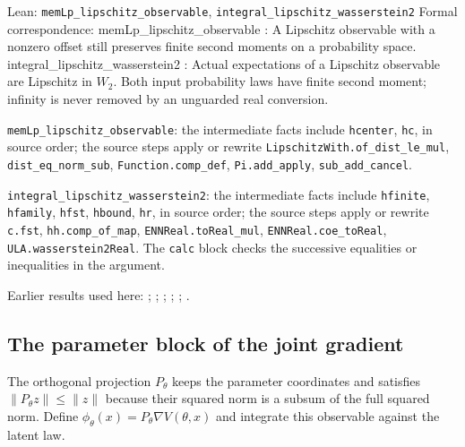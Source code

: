 \documentclass[11pt,a4paper]{report}
\begin{document}
\begin{leanbox}{Lean: \texttt{memLp\_\allowbreak{}lipschitz\_\allowbreak{}observable}, \texttt{integral\_\allowbreak{}lipschitz\_\allowbreak{}wasserstein2}}
Formal correspondence: memLp\_lipschitz\_observable : A Lipschitz observable with a nonzero offset still preserves finite second moments on a probability space. integral\_lipschitz\_wasserstein2 : Actual expectations of a Lipschitz observable are Lipschitz in \(W_2\). Both input probability laws have finite second moment; infinity is never removed by an unguarded real conversion.



\texttt{mem\allowbreak{}Lp\_\allowbreak{}lipschitz\_\allowbreak{}observable}: the intermediate facts include \texttt{hcenter}, \texttt{hc}, in source order; the source steps apply or rewrite \texttt{Lipschitz\allowbreak{}With.\allowbreak{}of\_\allowbreak{}dist\_\allowbreak{}le\_\allowbreak{}mul}, \texttt{dist\_\allowbreak{}eq\_\allowbreak{}norm\_\allowbreak{}sub}, \texttt{Function.\allowbreak{}comp\_\allowbreak{}def}, \texttt{Pi.\allowbreak{}add\_\allowbreak{}apply}, \texttt{sub\_\allowbreak{}add\_\allowbreak{}cancel}.



\texttt{integral\_\allowbreak{}lipschitz\_\allowbreak{}wasserstein2}: the intermediate facts include \texttt{hfinite}, \texttt{hfamily}, \texttt{hfst}, \texttt{hbound}, \texttt{hr}, in source order; the source steps apply or rewrite \texttt{c.\allowbreak{}fst}, \texttt{hh.\allowbreak{}comp\_\allowbreak{}of\_\allowbreak{}map}, \texttt{ENNReal.\allowbreak{}to\allowbreak{}Real\_\allowbreak{}mul}, \texttt{ENNReal.\allowbreak{}coe\_\allowbreak{}to\allowbreak{}Real}, \texttt{ULA.\allowbreak{}wasserstein2\allowbreak{}Real}. The \texttt{calc} block checks the successive equalities or inequalities in the argument.
\end{leanbox}


Earlier results used here: \cite[Section~3.17.1]{LangevinLean2026ULASC}; \cite[Section~3.17.2]{LangevinLean2026ULASC}; \cite[Section~3.17.3]{LangevinLean2026ULASC}; \cite[Section~3.17.4]{LangevinLean2026ULASC}; \cite[Section~3.18.2]{LangevinLean2026ULASC}; \cite[Section~3.21.2]{LangevinLean2026ULASC}.
\subsection{\texorpdfstring{The parameter block of the joint gradient}{The parameter block of the joint gradient}}
\label{report-step-ProximalLangevin-MeanFieldDrift-lean-2}


The orthogonal projection \(P_\theta\) keeps the parameter coordinates and satisfies \(\|P_\theta z\|\le\|z\|\) because their squared norm is a subsum of the full squared norm. Define \(\phi_\theta(x)=P_\theta\nabla V(\theta,x)\) and integrate this observable against the latent law.
\end{document}
